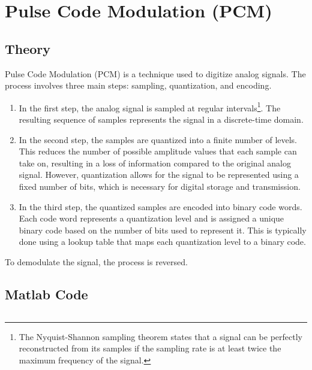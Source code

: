 \pagebreak

\section{Pulse Code Modulation (PCM)}
\label{sec:Pulse Code Modulation (PCM)}

\subsection{Theory}

Pulse Code Modulation (PCM) is a technique used to digitize analog signals.
The process involves three main steps: sampling, quantization, and encoding.


\begin{enumerate}
    \item In the first step, the analog signal is sampled at regular intervals\footnote[1]{The Nyquist-Shannon sampling theorem states that a signal can be perfectly reconstructed from its samples if the sampling rate is at least twice the maximum frequency of the signal.}.
          The resulting sequence of samples represents the signal in a discrete-time domain.

    \item In the second step, the samples are quantized into a finite number of levels.
          This reduces the number of possible amplitude values that each sample can take on, resulting in a loss of information compared to the original analog signal.
          However, quantization allows for the signal to be represented using a fixed number of bits, which is necessary for digital storage and transmission.

    \item In the third step, the quantized samples are encoded into binary code words.
          Each code word represents a quantization level and is assigned a unique binary code based on the number of bits used to represent it.
          This is typically done using a lookup table that maps each quantization level to a binary code.
\end{enumerate}

To demodulate the signal, the process is reversed.

\subsection{Matlab Code}

\inputminted[fontsize=\footnotesize,autogobble]{matlab}{code/pcm.m}

